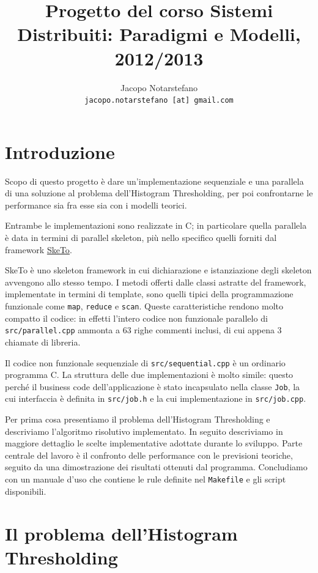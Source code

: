 \documentclass[12pt]{article}
\title{Progetto del corso Sistemi Distribuiti: Paradigmi e Modelli, 2012/2013}
\author{
	Jacopo Notarstefano\\
	\texttt{jacopo.notarstefano [at] gmail.com}
}
\date{}
\newcommand{\cpp}{C\nolinebreak\hspace{-.05em}\raisebox{.4ex}{\tiny\bf +}\nolinebreak\hspace{-.10em}\raisebox{.4ex}{\tiny\bf +}}
\begin{document}
  \maketitle
    \section{Introduzione}

    Scopo di questo progetto è dare un'implementazione sequenziale e una
    parallela di una soluzione al problema dell'Histogram Thresholding, per
    poi confrontarne le performance sia fra esse sia con i modelli teorici.

    Entrambe le implementazioni sono realizzate in \cpp; in particolare
    quella parallela è data in termini di parallel skeleton, più nello
    specifico quelli forniti dal framework 
    \href{http://sketo.ipl-lab.org/}{\underline{SkeTo}}.

    SkeTo è uno skeleton framework in cui dichiarazione e istanziazione degli
    skeleton avvengono allo stesso tempo. I metodi offerti dalle classi
    astratte del framework, implementate in termini di template, sono quelli
    tipici della programmazione funzionale come \texttt{map}, \texttt{reduce}
    e \texttt{scan}. Queste caratteristiche rendono molto compatto il codice:
    in effetti l'intero codice non funzionale parallelo di
    \texttt{src/parallel.cpp} ammonta a \(63\) righe commenti inclusi, di cui
    appena \(3\) chiamate di libreria.

    Il codice non funzionale sequenziale di \texttt{src/sequential.cpp} \`e
    un ordinario programma \cpp. La struttura delle due implementazioni \`e
    molto simile: questo perch\'e il business code dell'applicazione \`e
    stato incapsulato nella classe \texttt{Job}, la cui interfaccia \`e
    definita in \texttt{src/job.h} e la cui implementazione in
    \texttt{src/job.cpp}.

    Per prima cosa presentiamo il problema dell'Histogram Thresholding e
    descriviamo l'algoritmo risolutivo implementato. In seguito descriviamo in
    maggiore dettaglio le scelte implementative adottate durante lo sviluppo.
    Parte centrale del lavoro \`e il confronto delle performance con le
    previsioni teoriche, seguito da una dimostrazione dei risultati ottenuti
    dal programma. Concludiamo con un manuale d'uso che contiene le rule
    definite nel \texttt{Makefile} e gli script disponibili.

    \section{Il problema dell'Histogram Thresholding}
\end{document}
